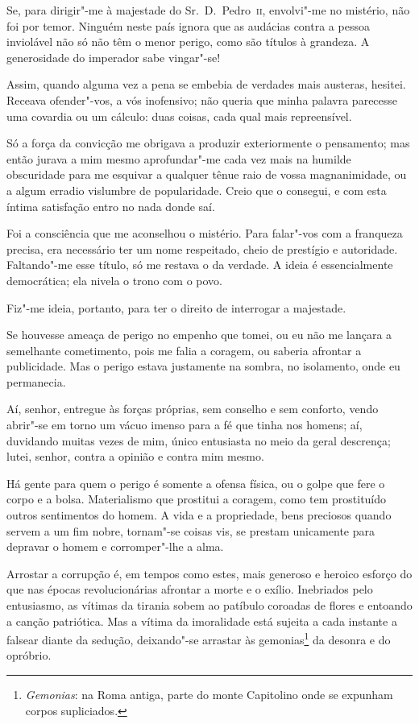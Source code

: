  Se, para dirigir"-me à majestade do Sr.~D.~Pedro~\textsc{ii}, envolvi"-me no
mistério, não foi por temor. Ninguém neste país ignora que as audácias
contra a pessoa inviolável não só não têm o menor perigo, como são
títulos à grandeza. A generosidade do imperador sabe vingar"-se!

 Assim, quando alguma vez a pena se embebia de verdades mais austeras,
hesitei. Receava ofender"-vos, a vós inofensivo; não queria que minha
palavra parecesse uma covardia ou um cálculo: duas coisas, cada qual
mais repreensível. 

 Só a força da convicção me obrigava a produzir exteriormente o
pensamento; mas então jurava a mim mesmo aprofundar"-me cada vez mais
na humilde obscuridade para me esquivar a qualquer tênue raio de vossa
magnanimidade, ou a algum erradio vislumbre de popularidade. Creio que
o consegui, e com esta íntima satisfação entro no nada donde saí. 

 Foi a consciência que me aconselhou o mistério. Para falar"-vos com a
franqueza precisa, era necessário ter um nome respeitado, cheio de
prestígio e autoridade. Faltando"-me esse título, só me restava o da
verdade. A ideia é essencialmente democrática; ela nivela o trono com o
povo. 

 Fiz"-me ideia, portanto, para ter o direito de interrogar a majestade.

 Se houvesse ameaça de perigo no empenho que tomei, ou eu não me lançara
a semelhante cometimento, pois me falia a coragem, ou saberia afrontar
a publicidade. Mas o perigo estava justamente na sombra, no isolamento,
onde eu permanecia. 

 Aí, senhor, entregue às forças próprias, sem conselho e sem conforto,
vendo abrir"-se em torno um vácuo imenso para a fé que tinha nos
homens; aí, duvidando muitas vezes de mim, único entusiasta no meio da
geral descrença; lutei, senhor, contra a opinião e contra mim mesmo. 

 Há gente para quem o perigo é somente a ofensa física, ou o golpe que
fere o corpo e a bolsa. Materialismo que prostitui a coragem, como tem
prostituído outros sentimentos do homem. A vida e a propriedade, bens
preciosos quando servem a um fim nobre, tornam"-se coisas vis, se
prestam unicamente para depravar o homem e corromper"-lhe a alma. 

 Arrostar a corrupção é, em tempos como estes, mais generoso e heroico
esforço do que nas épocas revolucionárias afrontar a morte e o exílio.
Inebriados pelo entusiasmo, as vítimas da tirania sobem ao patíbulo
coroadas de flores e entoando a canção patriótica. Mas a vítima da
imoralidade está sujeita a cada instante a falsear diante da sedução,
deixando"-se arrastar às
gemonias\footnote{ \textit{Gemonias}: na Roma antiga, parte do monte Capitolino onde se expunham
corpos supliciados.} da desonra e do opróbrio. 

